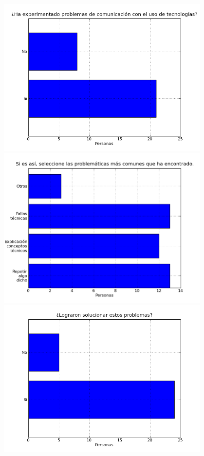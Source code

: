\begin{center}
	\includegraphics[width=0.8\textwidth]{images/fig8}\\
	\includegraphics[width=0.8\textwidth]{images/fig9}\\
	\includegraphics[width=0.8\textwidth]{images/fig10}\\

\end{center}
